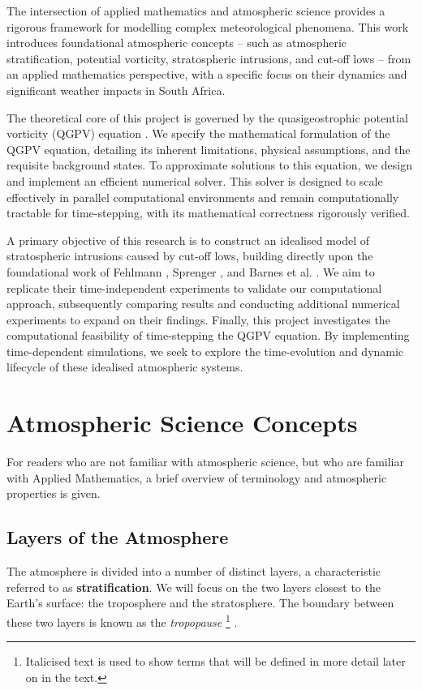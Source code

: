 \documentclass{article}
\begin{document}
The intersection of applied mathematics and atmospheric science provides a rigorous framework for modelling complex meteorological phenomena.
This work introduces foundational atmospheric concepts -- such as atmospheric stratification, potential vorticity, stratospheric intrusions, and cut-off lows -- from an applied mathematics perspective, with a specific focus on their dynamics and significant weather impacts in South Africa.

The theoretical core of this project is governed by the quasigeostrophic potential vorticity (QGPV) equation \cite{Hoskins1985}.
We specify the mathematical formulation of the QGPV equation, detailing its inherent limitations, physical assumptions, and the requisite background states.
To approximate solutions to this equation, we design and implement an efficient numerical solver.
This solver is designed to scale effectively in parallel computational environments and remain computationally tractable for time-stepping, with its mathematical correctness rigorously verified.

A primary objective of this research is to construct an idealised model of stratospheric intrusions caused by cut-off lows, building directly upon the foundational work of Fehlmann \cite{fehlmann1997pvelements}, Sprenger \cite{sprenger2007userguide}, and Barnes et al. \cite{Barnes2022main}.
We aim to replicate their time-independent experiments to validate our computational approach, subsequently comparing results and conducting additional numerical experiments to expand on their findings.
Finally, this project investigates the computational feasibility of time-stepping the QGPV equation.
By implementing time-dependent simulations, we seek to explore the time-evolution and dynamic lifecycle of these idealised atmospheric systems.

\section{Atmospheric Science Concepts}
For readers who are not familiar with atmospheric science, but who are familiar with Applied Mathematics, a brief overview of terminology and atmospheric properties is given.

\subsection{Layers of the Atmosphere}
The atmosphere is divided into a number of distinct layers, a characteristic referred to as \textbf{stratification}. We will focus on the two layers closest to the Earth's surface: the troposphere and the stratosphere. The boundary between these two layers is known as the \textit{tropopause} \footnote{Italicised text is used to show terms that will be defined in more detail later on in the text.} \cite{Vallis2017}.
\end{document}
